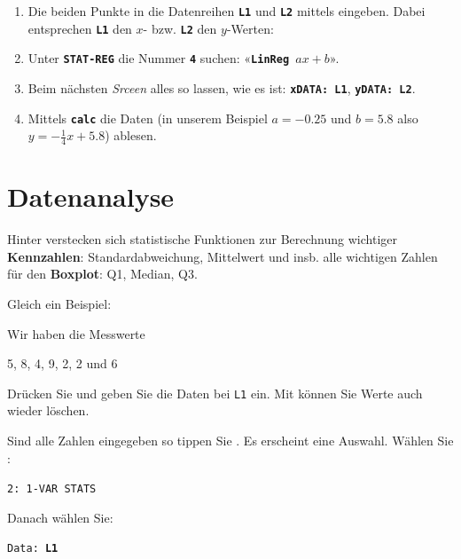 \begin{enumerate}
\item Die beiden Punkte in die Datenreihen \textbf{\texttt{L1}}
und \textbf{\texttt{L2}} mittels  eingeben. Dabei
entsprechen \textbf{\texttt{L1}} den $x$- bzw. \textbf{\texttt{L2}} den
$y$-Werten:

\item
Unter \textbf{\texttt{STAT-REG}}  
die Nummer \texttt{\textbf{4}} suchen:
«\texttt{\textbf{LinReg $ax+b$}}».

\item Beim nächsten \textit{Srceen} alles so lassen, wie es
ist: \texttt{\textbf{xDATA: L1}}, \textbf{\texttt{yDATA: L2}}.
\item Mittels \texttt{\textbf{calc}} die Daten (in unserem Beispiel
$a=-0.25$ und $b=5.8$ also $y=-\frac14x+5.8$) ablesen. 
\end{enumerate}


\newpage


\section{Datenanalyse}\label{daan}
Hinter  verstecken sich statistische
Funktionen zur Berechnung wichtiger \textbf{Kennzahlen}:
Standardabweichung, Mittelwert und insb. alle wichtigen Zahlen für
den \textbf{Boxplot}: Q1, Median, Q3.

Gleich ein Beispiel:

Wir haben die Messwerte

5, 8, 4, 9, 2, 2 und 6

Drücken Sie  und geben Sie die Daten
bei \texttt{L1} ein.
Mit  können Sie Werte auch wieder löschen.

Sind alle Zahlen eingegeben so tippen
Sie . Es erscheint eine
Auswahl. Wählen Sie :

\texttt{2: 1-VAR STATS}

Danach wählen Sie:

\texttt{Data: \textbf{L1}}

